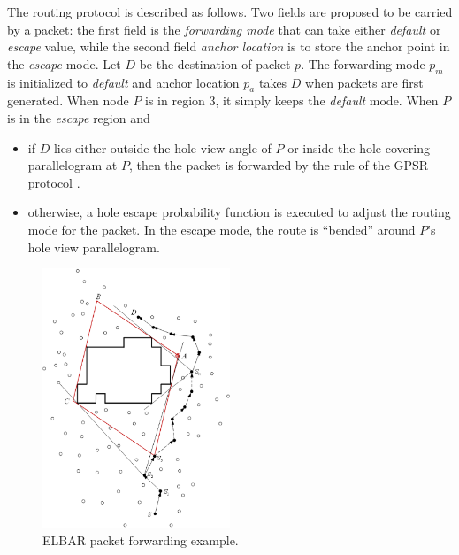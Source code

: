 The routing protocol is described as follows. Two fields are proposed to be carried by a packet: the first field is the \emph{forwarding mode} that can take either \emph{default} or \emph{escape} value, while the second field \emph{anchor location} is to store the anchor point in the \emph{escape} mode. Let $D$ be the destination of packet $p$. The forwarding mode $p_m$ is initialized to \emph{default} and anchor location $p_a$ takes $D$ when packets are first generated. When node $P$ is in region 3, it simply keeps the \emph{default} mode. When $P$ is in the \emph{escape} region and
\begin{itemize}
\item if $D$ lies either outside the hole view angle of $P$ or inside the hole covering parallelogram at $P$, then the packet is forwarded by the rule of the GPSR protocol \cite{gpsr}.
\item otherwise, a hole escape probability function is executed to adjust the routing mode for the packet. In the escape mode, the route is ``bended'' around $P$’s hole view parallelogram.
\end{itemize}

\begin{figure}[!htb]
\centering
\includegraphics[width=0.5\textwidth]{Chapter3/Chapter3Figs/fig-elbar-routing.eps}
\caption{ELBAR packet forwarding example.}
\label{fig-elbar-routing}
\end{figure}

